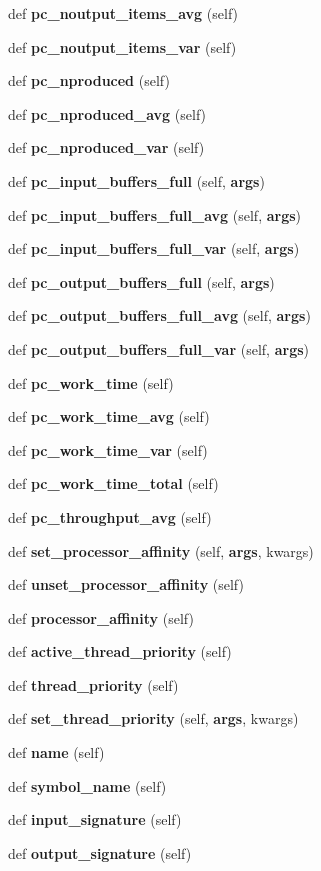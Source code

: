 \begin{DoxyCompactItemize}
\item 
def {\bf pc\+\_\+noutput\+\_\+items\+\_\+avg} (self)
\item 
def {\bf pc\+\_\+noutput\+\_\+items\+\_\+var} (self)
\item 
def {\bf pc\+\_\+nproduced} (self)
\item 
def {\bf pc\+\_\+nproduced\+\_\+avg} (self)
\item 
def {\bf pc\+\_\+nproduced\+\_\+var} (self)
\item 
def {\bf pc\+\_\+input\+\_\+buffers\+\_\+full} (self, {\bf args})
\item 
def {\bf pc\+\_\+input\+\_\+buffers\+\_\+full\+\_\+avg} (self, {\bf args})
\item 
def {\bf pc\+\_\+input\+\_\+buffers\+\_\+full\+\_\+var} (self, {\bf args})
\item 
def {\bf pc\+\_\+output\+\_\+buffers\+\_\+full} (self, {\bf args})
\item 
def {\bf pc\+\_\+output\+\_\+buffers\+\_\+full\+\_\+avg} (self, {\bf args})
\item 
def {\bf pc\+\_\+output\+\_\+buffers\+\_\+full\+\_\+var} (self, {\bf args})
\item 
def {\bf pc\+\_\+work\+\_\+time} (self)
\item 
def {\bf pc\+\_\+work\+\_\+time\+\_\+avg} (self)
\item 
def {\bf pc\+\_\+work\+\_\+time\+\_\+var} (self)
\item 
def {\bf pc\+\_\+work\+\_\+time\+\_\+total} (self)
\item 
def {\bf pc\+\_\+throughput\+\_\+avg} (self)
\item 
def {\bf set\+\_\+processor\+\_\+affinity} (self, {\bf args}, kwargs)
\item 
def {\bf unset\+\_\+processor\+\_\+affinity} (self)
\item 
def {\bf processor\+\_\+affinity} (self)
\item 
def {\bf active\+\_\+thread\+\_\+priority} (self)
\item 
def {\bf thread\+\_\+priority} (self)
\item 
def {\bf set\+\_\+thread\+\_\+priority} (self, {\bf args}, kwargs)
\item 
def {\bf name} (self)
\item 
def {\bf symbol\+\_\+name} (self)
\item 
def {\bf input\+\_\+signature} (self)
\item 
def {\bf output\+\_\+signature} (self)
\item 

\end{DoxyCompactItemize}
